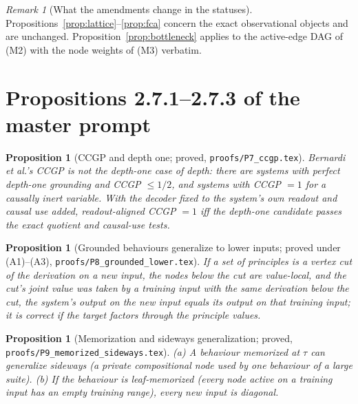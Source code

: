\documentclass[11pt]{article}
\theoremstyle{definition}
\theoremstyle{plain}
\newtheorem{proposition}[definition]{Proposition}
\theoremstyle{remark}
\newtheorem{remark}[definition]{Remark}
\begin{document}
\begin{remark}[What the amendments change in the statuses]
Propositions~\ref{prop:lattice}--\ref{prop:fca} concern the exact
observational objects and are unchanged. Proposition~\ref{prop:bottleneck} applies to
the active-edge DAG of (M2) with the node weights of (M3) verbatim.
\end{remark}

\section{Propositions 2.7.1--2.7.3 of the master prompt}

\begin{proposition}[CCGP and depth one; proved, \texttt{proofs/P7\_ccgp.tex}]
\label{prop:ccgp}
Bernardi et al.'s CCGP is not the depth-one case of depth: there are systems
with perfect depth-one grounding and CCGP $\le1/2$, and systems with CCGP $=1$
for a causally inert variable. With the decoder fixed to the system's own
readout and causal use added, readout-aligned CCGP $=1$ iff the depth-one
candidate passes the exact quotient and causal-use tests.
\end{proposition}

\begin{proposition}[Grounded behaviours generalize to lower inputs; proved
under (A1)--(A3), \texttt{proofs/P8\_grounded\_lower.tex}]\label{prop:lower}
If a set of principles is a vertex cut of the derivation on a new input,
the nodes below the cut are value-local, and the cut's joint value was taken
by a training input with the same derivation below the cut, the system's
output on the new input equals its output on that training input; it is
correct if the target factors through the principle values.
\end{proposition}

\begin{proposition}[Memorization and sideways generalization; proved,
\texttt{proofs/P9\_memorized\_sideways.tex}]\label{prop:memoside}
(a) A behaviour memorized at $\tau$ can generalize sideways (a private
compositional node used by one behaviour of a large suite). (b) If the
behaviour is leaf-memorized (every node active on a training input has an
empty training range), every new input is diagonal.
\end{proposition}
\end{document}
